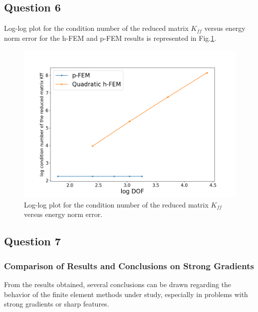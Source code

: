 \documentclass[twoside,twocolumn,10pt]{article}
\begin{document}
\subsection{Question 6}
Log-log plot for the condition number of the reduced matrix $K_{ff}$ versus energy norm error for the h-FEM and p-FEM results is represented in Fig.\ref{fig:contK}.
\begin{figure}[!ht]
  \centering
  \includegraphics[width=1.\linewidth]{Q1/cont_K.png}
  \caption{Log-log plot for the condition number of the reduced matrix $K_{ff}$ versus energy norm error.}
  \label{fig:contK}
\end{figure}

\subsection{Question 7}

\subsubsection{Comparison of Results and Conclusions on Strong Gradients}
From the results obtained, several conclusions can be drawn regarding the behavior of the finite element methods under study, especially in problems with strong gradients or sharp features.
\end{document}
